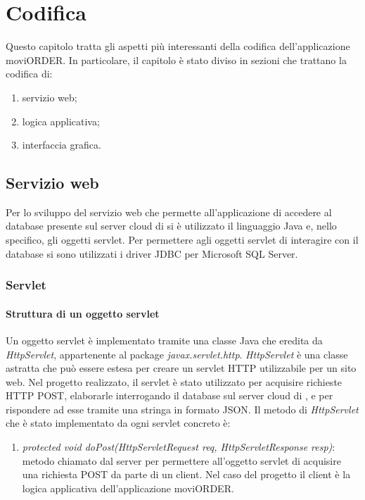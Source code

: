 \chapter{Codifica}

Questo capitolo tratta gli aspetti più interessanti della codifica dell'applicazione moviORDER. In particolare, il capitolo è stato diviso in sezioni che trattano la codifica di:
\begin{enumerate}
	\item servizio web;
	\item logica applicativa;
	\item interfaccia grafica.
\end{enumerate}

\section{Servizio web}

Per lo sviluppo del servizio web che permette all'applicazione di accedere al database presente sul server cloud di \visione{} si è utilizzato il linguaggio Java e, nello specifico, gli oggetti servlet. Per permettere agli oggetti servlet di interagire con il database si sono utilizzati i driver JDBC per Microsoft SQL Server. 

\subsection{Servlet}

\subsubsection{Struttura di un oggetto servlet}

Un oggetto servlet è implementato tramite una classe Java che eredita da \textit{HttpServlet}, appartenente al package \textit{javax.servlet.http}. \textit{HttpServlet} è una classe astratta che può essere estesa per creare un servlet HTTP utilizzabile per un sito web. Nel progetto realizzato, il servlet è stato utilizzato per acquisire richieste HTTP POST, elaborarle interrogando il database sul server cloud di \visione{}, e per rispondere ad esse tramite una stringa in formato JSON. Il metodo di \textit{HttpServlet} che è stato implementato da ogni servlet concreto è:
\begin{enumerate}
	\item \textit{protected void doPost(HttpServletRequest req, HttpServletResponse resp)}: metodo chiamato dal server per permettere all'oggetto servlet di acquisire una richiesta POST da parte di un client. Nel caso del progetto il client è la logica applicativa dell'applicazione moviORDER.
\end{enumerate}

